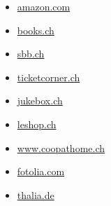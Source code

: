 \begin{multicols}{3}
    \begin{itemize}
        \item\href{https://www.amazon.com}{amazon.com}
        \item\href{https://www.orellfuessli.ch/shop/home/show/}{books.ch}
        \item\href{https://www.sbb.ch/}{sbb.ch}
        \item\href{https://www.ticketcorner.ch}{ticketcorner.ch}
        \item\href{https://www.jukebox.ch}{jukebox.ch}
        \item\href{https://www.leshop.ch/}{leshop.ch}
        \item\href{https://www.coopathome.ch}{www.coopathome.ch}
        \item\href{https://de.fotolia.com}{fotolia.com}
        \item\href{https://www.thalia.de/}{thalia.de}
    \end{itemize}
\end{multicols}


%
%
%
%
%
%

